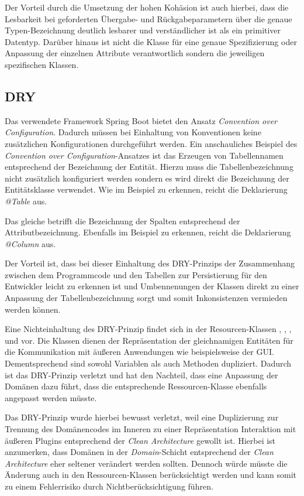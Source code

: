 Der Vorteil durch die Umsetzung der hohen Kohäsion ist auch hierbei, dass die Lesbarkeit bei geforderten Übergabe- und Rückgabeparametern über die genaue Typen-Bezeichnung deutlich lesbarer und verständlicher ist als ein primitiver Datentyp.
Darüber hinaus ist nicht die Klasse \href{}{} für eine genaue Spezifizierung oder Anpassung der einzelnen Attribute verantwortlich sondern die jeweiligen spezifischen Klassen.

\subsection{\ac{DRY}}
Das verwendete Framework Spring Boot bietet den Ansatz \textit{Convention over Configuration}.
Dadurch müssen bei Einhaltung von Konventionen keine zusätzlichen Konfigurationen durchgeführt werden.
Ein anschauliches Beispiel des \textit{Convention over Configuration}-Ansatzes ist das Erzeugen von Tabellennamen entsprechend der Bezeichnung der Entität.
Hierzu muss die Tabellenbezeichnung nicht zusätzlich konfiguriert werden sondern es wird direkt die Bezeichnung der Entitätsklasse verwendet.
Wie im Beispiel \href{}{} zu erkennen, reicht die Deklarierung \textit{@Table} aus.

Das gleiche betrifft die Bezeichnung der Spalten entsprechend der Attributbezeichnung.
Ebenfalls im Beispiel \href{}{} zu erkennen, reicht die Deklarierung \textit{@Column} aus.

Der Vorteil ist, dass bei dieser Einhaltung des \ac{DRY}-Prinzips der Zusammenhang zwischen dem Programmcode und den Tabellen zur Persistierung für den Entwickler leicht zu erkennen ist und Umbennenungen der Klassen direkt zu einer Anpassung der Tabellenbezeichnung sorgt und somit Inkonsistenzen vermieden werden können.

Eine Nichteinhaltung des \ac{DRY}-Prinzip findet sich in der Resourcen-Klassen \href{}{}, \href{}{}, \href{}{}, \href{}{} und \href{}{} vor.
Die Klassen dienen der Repräsentation der gleichnamigen Entitäten für die Kommunikation mit äußeren Anwendungen wie beispielsweise der \ac{GUI}.
Dementsprechend sind sowohl Variablen als auch Methoden dupliziert.
Dadurch ist das \ac{DRY}-Prinzip verletzt und hat den Nachteil, dass eine Anpassung der Domänen dazu führt, dass die entsprechende Ressourcen-Klasse ebenfalls angepasst werden müsste.

Das \ac{DRY}-Prinzip wurde hierbei bewusst verletzt, weil eine Duplizierung zur Trennung des Domänencodes im Inneren zu einer Repräsentation Interaktion mit äußeren Plugins entsprechend der \textit{Clean Architecture} gewollt ist.
Hierbei ist anzumerken, dass Domänen in der \textit{Domain}-Schicht entsprechend der \textit{Clean Architecture} eher seltener verändert werden sollten.
Dennoch würde müsste die Änderung auch in den Ressourcen-Klassen berücksichtigt werden und kann somit zu einem Fehlerrisiko durch Nichtberücksichtigung führen.
